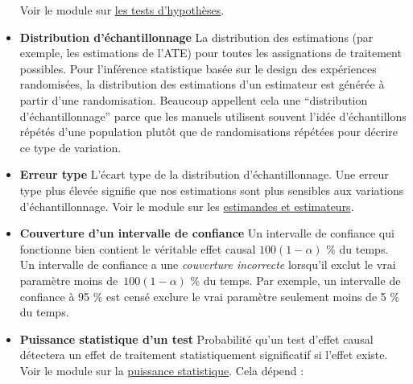 \documentclass[
  12pt,
]{book}
\begin{document}
\begin{itemize}
  Voir le module sur \href{hypothesis-testing.html}{les tests d'hypothèses}.
\item
  \textbf{Distribution d'échantillonnage} La distribution des estimations (par exemple, les estimations de l'ATE) pour toutes les assignations de traitement possibles.
  Pour l'inférence statistique basée sur le design des expériences randomisées, la distribution des estimations d'un estimateur est générée à partir d'une randomisation.
  Beaucoup appellent cela une ``distribution d'échantillonnage'' parce que les manuels utilisent souvent l'idée d'échantillons répétés d'une population plutôt que de randomisations répétées pour décrire ce type de variation.
\item
  \textbf{Erreur type} L'écart type de la distribution d'échantillonnage. Une erreur type plus élevée signifie que nos estimations sont plus sensibles aux variations d'échantillonnage.
  Voir le module sur les \href{estimands-and-estimateurs.html}{estimandes et estimateurs}.
\item
  \textbf{Couverture d'un intervalle de confiance} Un intervalle de confiance qui fonctionne bien contient le véritable effet causal \(100 ( 1 - \alpha)\) \% du temps.
  Un intervalle de confiance a une \emph{couverture incorrecte} lorsqu'il exclut le vrai paramètre moins de~\(100 (1 - \alpha)\) \% du temps.
  Par exemple, un intervalle de confiance à 95 \% est censé exclure le vrai paramètre seulement moins de 5 \% du temps.
\item
  \textbf{Puissance statistique d'un test} Probabilité qu'un test d'effet causal détectera un effet de traitement statistiquement significatif si l'effet existe.
  Voir le module sur la \href{statistical-power-and-design-diagnosands.html}{puissance statistique}.
  Cela dépend :


\end{itemize}
\end{document}
